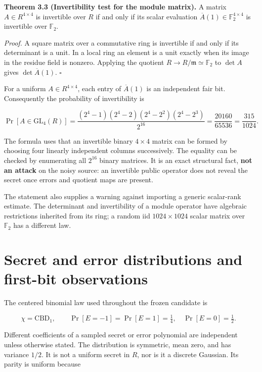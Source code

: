 \documentclass[
  11pt,
  a4paper,
  oneside]{report}
\begin{document}
\textbf{Theorem 3.3 (Invertibility test for the module matrix).} A
matrix \(A\in R^{4\times4}\) is invertible over \(R\) if and only if its
scalar evaluation \(\overline A(1)\in\mathbb F_2^{4\times4}\) is
invertible over \(\mathbb F_2\).

\emph{Proof.} A square matrix over a commutative ring is invertible if
and only if its determinant is a unit. In a local ring an element is a
unit exactly when its image in the residue field is nonzero. Applying
the quotient \(R\to R/\mathfrak m\simeq\mathbb F_2\) to \(\det A\) gives
\(\det\overline A(1)\). \(\square\)

For a uniform \(A\in R^{4\times4}\), each entry of \(\overline A(1)\) is
an independent fair bit. Consequently the probability of invertibility
is

\[
\Pr[A\in\mathrm{GL}_4(R)]
=\frac{(2^4-1)(2^4-2)(2^4-2^2)(2^4-2^3)}{2^{16}}
=\frac{20160}{65536}=\frac{315}{1024}.
\]

The formula uses that an invertible binary \(4\times4\) matrix can be
formed by choosing four linearly independent columns successively. The
equality can be checked by enumerating all \(2^{16}\) binary matrices.
It is an exact structural fact, \textbf{not an attack} on the noisy
source: an invertible public operator does not reveal the secret once
errors and quotient maps are present.

The statement also supplies a warning against importing a generic
scalar-rank estimate. The determinant and invertibility of a module
operator have algebraic restrictions inherited from its ring; a random
iid \(1024\times1024\) scalar matrix over \(\mathbb F_2\) has a
different law.

\section{Secret and error distributions and first-bit
observations}\label{secret-and-error-distributions-and-first-bit-observations}

The centered binomial law used throughout the frozen candidate is

\[
\chi=\mathrm{CBD}_1,\qquad
\Pr[E=-1]=\Pr[E=1]=\tfrac14,\quad
\Pr[E=0]=\tfrac12.
\]

Different coefficients of a sampled secret or error polynomial are
independent unless otherwise stated. The distribution is symmetric, mean
zero, and has variance \(1/2\). It is not a uniform secret in \(R\), nor
is it a discrete Gaussian. Its parity is uniform because
\end{document}
